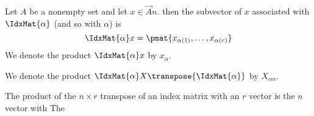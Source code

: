 Let $A$ be a nonempty set and let $x \in \Vec{A}{n}$.
then the subvector of $x$ associated with $\IdxMat{\alpha}$ (and so with $\alpha$) is
$$
  \IdxMat{\alpha}x = \pmat{x_{\alpha(1)}, \dots, x_{\alpha(r)}}
$$
We denote the product $\IdxMat{\alpha}x$ by $x_{\alpha}$.

We denote the product $\IdxMat{\alpha}X\transpose{\IdxMat{\alpha}}$ by $X_{\alpha\alpha}$.



The product of the $n \times r$ transpose of an index  matrix with an $r$ vector is the $n$ vector with
The
%
%
\strats
